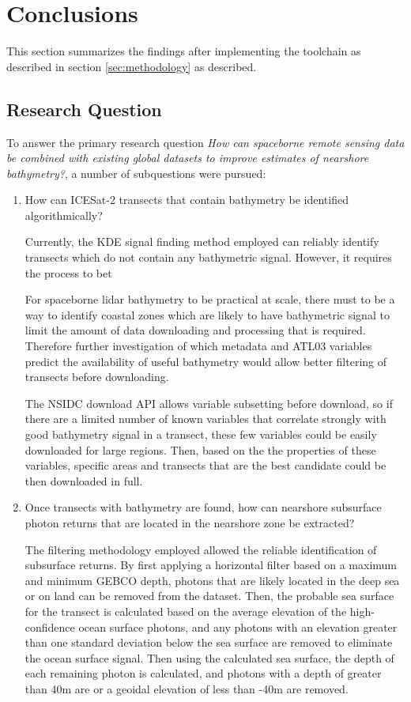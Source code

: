 \chapter{Conclusions}
This section summarizes the findings after implementing the toolchain as described in section \ref{sec:methodology} as described.

\section{Research Question}
To answer the primary research question \emph{How can spaceborne remote sensing data be combined with existing global datasets to improve estimates of nearshore bathymetry?}, a number of subquestions were pursued:

\begin{enumerate}
    \item How can ICESat-2 transects that contain bathymetry be identified algorithmically?

    Currently, the KDE signal finding method employed can reliably identify transects which do not contain any bathymetric signal. However, it requires the process to bet 
    
    For spaceborne lidar bathymetry to be practical at scale, there must to be a way to identify coastal zones which are likely to have bathymetric signal to limit the amount of data downloading and processing that is required. Therefore further investigation of which metadata and ATL03 variables predict the availability of useful bathymetry would allow better filtering of transects before downloading. 
    
    The NSIDC download API allows variable subsetting before download, so if there are a limited number of known variables that correlate strongly with good bathymetry signal in a transect, these few variables could be easily downloaded for large regions.  
    Then, based on the the properties of these variables, specific areas and transects that are the best candidate could be then downloaded in full.
    
    \item Once transects with bathymetry are found, how can nearshore subsurface photon returns that are located in the nearshore zone be extracted?
    
    The filtering methodology employed allowed the reliable identification of subsurface returns. By first applying a horizontal filter based on a maximum and minimum GEBCO depth, photons that are likely located in the deep sea or on land can be removed from the dataset. Then, the probable sea surface for the transect is calculated based on the average elevation of the high-confidence ocean surface photons, and any photons with an elevation greater than one standard deviation below the sea surface are removed to eliminate the ocean surface signal. Then using the calculated sea surface, the depth of each remaining photon is calculated, and photons with a depth of greater than 40m are or a geoidal elevation of less than -40m are removed. 
    

\end{enumerate}
